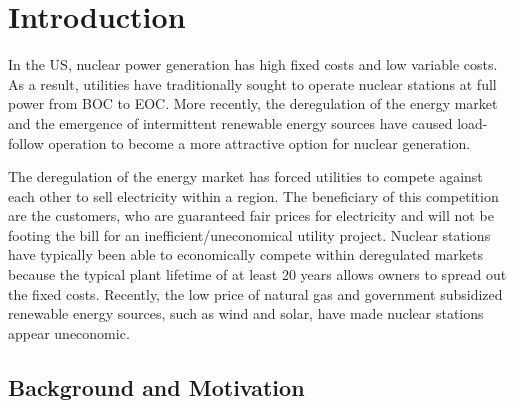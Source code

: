 \documentclass[edeposit,fullpage,11pt]{uiucthesis2009}
\begin{document}

\mainmatter

\chapter{Introduction}

In the \gls{US}, nuclear power generation has high fixed costs and low variable costs. 
As a result, utilities have traditionally sought to operate nuclear stations at full power from \gls{BOC} to \gls{EOC}. 
More recently, the deregulation of the energy market and the emergence of intermittent renewable energy sources have caused load-follow operation to become a more attractive option for nuclear generation. 

The deregulation of the energy market has forced utilities to compete against each other to sell electricity within a region.
The beneficiary of this competition are the customers, who are guaranteed fair prices for electricity and will not be footing the bill for an inefficient/uneconomical utility project. %
Nuclear stations have typically been able to economically compete within deregulated markets because the typical plant lifetime of at least 20 years allows owners to spread out the fixed costs.
Recently, the low price of natural gas and government subsidized renewable energy sources, such as wind and solar, have made nuclear stations appear uneconomic.   

\section{Background and Motivation}
\end{document}
